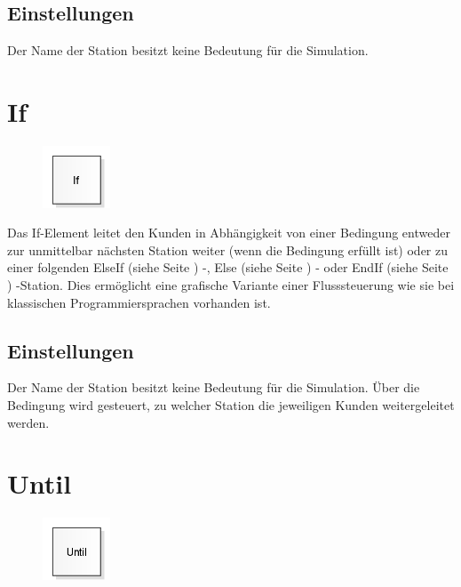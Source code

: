 \subsection*{Einstellungen}

Der Name der Station besitzt keine Bedeutung für die Simulation.


\section{If}
\label{ref:ModelElementLogicIf}

\begin{figure}
\vspace{-22pt}
\includegraphics[width=2cm]{imageModelElementLogicIf.png}
\vspace{-22pt}
\end{figure}

Das If-Element leitet den Kunden in Abhängigkeit von einer Bedingung entweder
zur unmittelbar nächsten Station weiter (wenn die Bedingung erfüllt ist) oder
zu einer folgenden ElseIf (siehe Seite \pageref{ref:ModelElementLogicElseIf}) -,
Else (siehe Seite \pageref{ref:ModelElementLogicElse}) - oder
EndIf (siehe Seite \pageref{ref:ModelElementLogicEndIf}) -Station.
Dies ermöglicht eine grafische Variante einer Flusssteuerung wie sie bei
klassischen Programmiersprachen vorhanden ist.

\subsection*{Einstellungen}

Der Name der Station besitzt keine Bedeutung für die Simulation. Über die Bedingung
wird gesteuert, zu welcher Station die jeweiligen Kunden weitergeleitet werden.


\section{Until}
\label{ref:ModelElementLogicUntil}

\begin{figure}
\vspace{-22pt}
\includegraphics[width=2cm]{imageModelElementLogicUntil.png}
\vspace{-22pt}
\end{figure}

